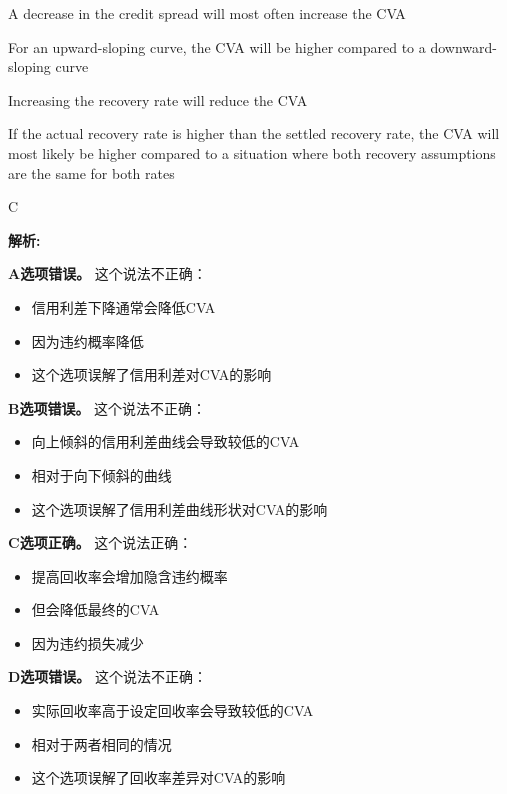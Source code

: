 \documentclass{article}
\newenvironment{explanation}
{\textbf{解析:}\par}
{\par}
\begin{document}
\begin{choices}
    \item A decrease in the credit spread will most often increase the CVA
    \item For an upward-sloping curve, the CVA will be higher compared to a downward-sloping curve
    \item Increasing the recovery rate will reduce the CVA
    \item If the actual recovery rate is higher than the settled recovery rate, the CVA will most likely be higher compared to a situation where both recovery assumptions are the same for both rates
\end{choices}

\begin{correctanswer}
    C
\end{correctanswer}

\begin{explanation}
    \textbf{A选项错误。}
    这个说法不正确：
    \begin{itemize}
        \item 信用利差下降通常会降低CVA
        \item 因为违约概率降低
        \item 这个选项误解了信用利差对CVA的影响
    \end{itemize}

    \textbf{B选项错误。}
    这个说法不正确：
    \begin{itemize}
        \item 向上倾斜的信用利差曲线会导致较低的CVA
        \item 相对于向下倾斜的曲线
        \item 这个选项误解了信用利差曲线形状对CVA的影响
    \end{itemize}

    \textbf{C选项正确。}
    这个说法正确：
    \begin{itemize}
        \item 提高回收率会增加隐含违约概率
        \item 但会降低最终的CVA
        \item 因为违约损失减少
    \end{itemize}

    \textbf{D选项错误。}
    这个说法不正确：
    \begin{itemize}
        \item 实际回收率高于设定回收率会导致较低的CVA
        \item 相对于两者相同的情况
        \item 这个选项误解了回收率差异对CVA的影响
    \end{itemize}
\end{explanation}
\end{document}
